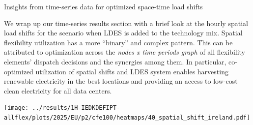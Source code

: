 \begin{frame}{Insights from time-series data for optimized space-time load shifts}
\label{timeseries-p2}

  {\footnotesize

  \vspace{-0.1cm}
  We wrap up our time-series results section with a brief look at the \alert{hourly spatial load shifts} for the scenario when LDES is added to the technology mix. Spatial flexibility utilization has a more \enquote{binary} and complex pattern. This can be attributed to optimization across the \textit{nodes x time periods graph} of all flexibility elements' dispatch decisions and the synergies among them. In particular, co-optimized utilization of spatial shifts and LDES system enables harvesting renewable electricity in the best locations and providing an access to low-cost clean electricity for all data centers.

  \texttt{[image: ../results/1H-IEDKDEFIPT-allflex/plots/2025/EU/p2/cfe100/heatmaps/40\_spatial\_shift\_ireland.pdf]}
  }
  
\end{frame}



